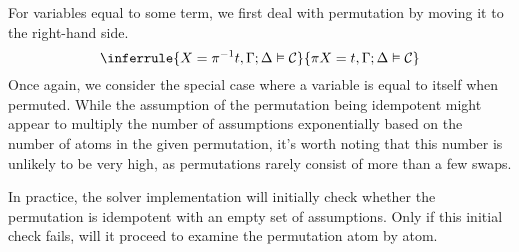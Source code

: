 \documentclass[english, mgr]{iithesis}
\begin{document}
For variables equal to some term,
we first deal with permutation by moving it to the right-hand side.
$$
\inferrule{
   \termv = \pi^{-1} \term, \cEnv ; \icEnv \vDash \sconstr
}{
   \pi \termv = \term, \cEnv ; \icEnv \vDash \sconstr
}
$$
Once again, we consider the special case where a variable is equal to itself when permuted.
While the assumption of the permutation being idempotent might appear to multiply the number of assumptions exponentially based on the number of atoms in the given permutation,
it's worth noting that this number is unlikely to be very high, as permutations rarely consist of more than a few swaps.

In practice, the solver implementation will initially check whether the permutation is idempotent with an empty set of assumptions.
Only if this initial check fails, will it proceed to examine the permutation atom by atom.
\end{document}
